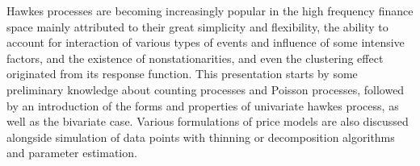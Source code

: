 Hawkes processes are becoming increasingly popular in the high frequency finance space mainly attributed to their great simplicity and flexibility, the ability to account for interaction of various types of events and influence of some intensive factors, and the existence of nonstationarities, and even the clustering effect originated from its response function. This presentation starts by some preliminary knowledge about counting processes and Poisson processes, followed by an introduction of the forms and properties of univariate hawkes process, as well as the bivariate case. Various formulations of price models are also discussed alongside simulation of data points with thinning or decomposition algorithms and parameter estimation.

